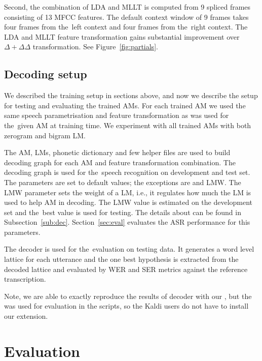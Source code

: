 Second, the combination of \ac{LDA} and \ac{MLLT} is computed from 9 spliced frames consisting of 13 \ac{MFCC} features. 
The default context window of 9 frames takes four frames from the~left context and four frames from the~right context.
The \ac{LDA} and \ac{MLLT} feature transformation gains substantial improvement over $\Delta+\Delta\Delta$ transformation.
See Figure~\ref{fig:partials}.

\subsection*{Decoding setup}
We described the training setup in sections above, and now we describe the setup for testing and evaluating the trained \acp{AM}.
For each trained \ac{AM} we used the same speech parametrisation and feature transformation as was used for the~given \ac{AM} at training time.
We experiment with all trained \acp{AM} with both zerogram and bigram \ac{LM}.

The \ac{AM}, \acp{LM}, phonetic dictionary and few helper files are used to build  decoding graph for each \ac{AM} and feature transformation combination.
The decoding graph is used for the~speech recognition on development and test set.
The parameters are set to default values; the exceptions are  and \acl{LMW}. 
The \ac{LMW} parameter sets the weight of a \ac{LM}, i.e., it regulates how much the \ac{LM} is used to help \ac{AM} in decoding. 
The \ac{LMW} value is estimated on the development set and the~best value is used for testing.
The details about  can be found in Subsection~\ref{sub:dec}.
Section~\ref{sec:eval} evaluates the \ac{ASR} performance for this parameters.

The  decoder is used for the~evaluation on testing data.
It generates a word level lattice for each utterance and the one best hypothesis is extracted from the decoded lattice and evaluated by \ac{WER} and \ac{SER} metrics against the reference transcription.

Note, we are able to exactly reproduce the results of  decoder with our , but the  was used for evaluation in the scripts, so the Kaldi users do not have to install our extension.

\section{Evaluation}
\label{sec:am_eval}


